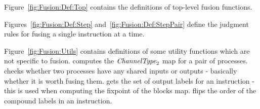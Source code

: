Figure~\ref{fig:Fusion:Def:Top} contains the definitions of top-level fusion functions.

Figures~\ref{fig:Fusion:Def:Step} and~\ref{fig:Fusion:Def:StepPair} define the judgment rules for fusing a single instruction at a time.



Figure~\ref{fig:Fusion:Utils} contains definitions of some utility functions which are not specific to fusion.
 computes the $\textit{ChannelType}_2$ map for a pair of processes.
 checks whether two processes have any shared inputs or outputs - basically whether it is worth fusing them.
 gets the set of output labels for an instruction - this is used when computing the fixpoint of the blocks map.
 flips the order of the compound labels in an instruction.
